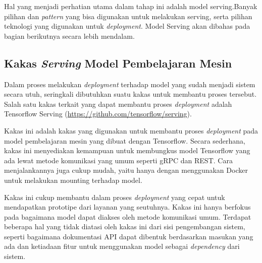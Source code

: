 Hal yang menjadi perhatian utama dalam tahap ini adalah model serving.Banyak pilihan dan \textit{pattern} yang bisa digunakan untuk melakukan serving, serta pilihan teknologi yang digunakan untuk \textit{deployment}.
Model Serving akan dibahas pada bagian berikutnya secara lebih mendalam.

\subsection{Kakas \textit{Serving} Model Pembelajaran Mesin}

Dalam proses melakukan \textit{deployment} terhadap model yang sudah menjadi sistem secara utuh, seringkali dibutuhkan suatu kakas untuk membantu proses tersebut.
Salah satu kakas terkait yang dapat membantu proses \textit{deployment} adalah Tensorflow Serving (\href{https://github.com/tensorflow/serving}{https://github.com/tensorflow/serving}).

Kakas ini adalah kakas yang digunakan untuk membantu proses \textit{deployment} pada model pembelajaran mesin yang dibuat dengan Tensorflow.
Secara sederhana, kakas ini menyediakan kemampuan untuk membungkus model Tensorflow yang ada lewat metode komunikasi yang umum seperti gRPC dan REST.\@
Cara menjalankannya juga cukup mudah, yaitu hanya dengan menggunakan Docker untuk melakukan mounting terhadap model.

Kakas ini cukup membantu dalam proses \textit{deployment} yang cepat untuk mendapatkan prototipe dari layanan yang seutuhnya.
Kakas ini hanya berfokus pada bagaimana model dapat diakses oleh metode komunikasi umum.
Terdapat beberapa hal yang tidak diatasi oleh kakas ini dari sisi pengembangan sistem, seperti bagaimana dokumentasi API dapat dibentuk berdasarkan masukan yang ada dan ketiadaan fitur untuk menggunakan model sebagai \textit{dependency} dari sistem.
